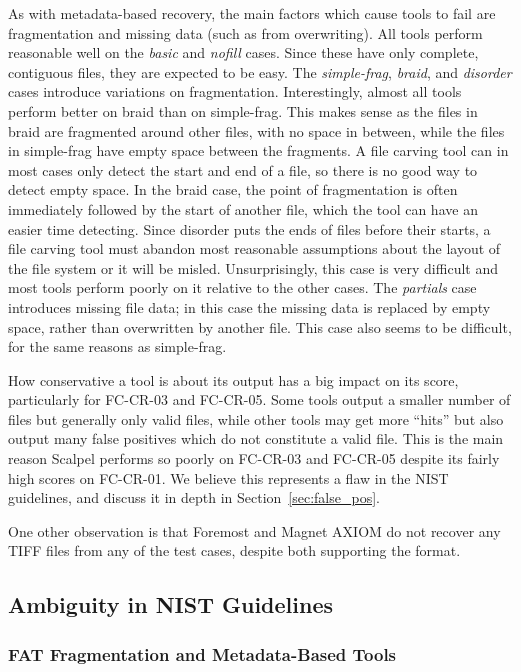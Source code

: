 As with metadata-based recovery, the main factors which cause tools to fail are fragmentation and missing data (such as from overwriting).
All tools perform reasonable well on the \emph{basic} and \emph{nofill} cases.
Since these have only complete, contiguous files, they are expected to be easy.
The \emph{simple-frag}, \emph{braid}, and \emph{disorder} cases introduce variations on fragmentation.
Interestingly, almost all tools perform better on braid than on simple-frag.
This makes sense as the files in braid are fragmented around other files, with no space in between, while the files in simple-frag have empty space between the fragments.
A file carving tool can in most cases only detect the start and end of a file, so there is no good way to detect empty space. 
In the braid case, the point of fragmentation is often immediately followed by the start of another file, which the tool can have an easier time detecting.
Since disorder puts the ends of files before their starts, a file carving tool must abandon most reasonable assumptions about the layout of the file system or it will be misled.
Unsurprisingly, this case is very difficult and most tools perform poorly on it relative to the other cases.
The \emph{partials} case introduces missing file data; in this case the missing data is replaced by empty space, rather than overwritten by another file.
This case also seems to be difficult, for the same reasons as simple-frag.

How conservative a tool is about its output has a big impact on its score, particularly for FC-CR-03 and FC-CR-05.
Some tools output a smaller number of files but generally only valid files, while other tools may get more ``hits'' but also output many false positives which do not constitute a valid file.
This is the main reason Scalpel performs so poorly on FC-CR-03 and FC-CR-05 despite its fairly high scores on FC-CR-01.
We believe this represents a flaw in the NIST guidelines, and discuss it in depth in Section~\ref{sec:false_pos}.

One other observation is that Foremost and Magnet AXIOM do not recover any TIFF files from any of the test cases, despite both supporting the format.


\subsection{Ambiguity in NIST Guidelines}
\subsubsection{FAT Fragmentation and Metadata-Based Tools}

